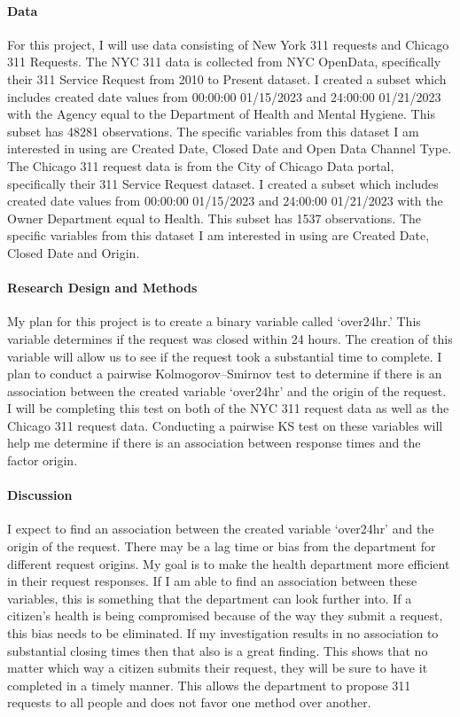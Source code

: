 \documentclass[12pt]{article}
\begin{document}
\paragraph{Data}
For this project, I will use data consisting of New York 311 requests and Chicago 311 Requests. 
The NYC 311 data is collected from NYC OpenData, specifically their 311 Service Request from 2010 to Present dataset. 
I created a subset which includes created date values from 00:00:00 01/15/2023 and 24:00:00 01/21/2023 with the Agency equal to the Department of Health and Mental Hygiene. 
This subset has 48281 observations. 
The specific variables from this dataset I am interested in using are Created Date, Closed Date and  Open Data Channel Type. 
The Chicago 311 request data is from the City of Chicago Data portal, specifically their 311 Service Request dataset. 
I created a subset which includes created date values from 00:00:00 01/15/2023 and 24:00:00 01/21/2023 with the Owner Department equal to Health. 
This subset has 1537 observations. 
The specific variables from this dataset I am interested in using are Created Date, Closed Date and Origin. 


\paragraph{Research Design and Methods}
My plan for this project is to create a binary variable called ‘over24hr.’ 
This variable determines if the request was closed within 24 hours. 
The creation of this variable will allow us to see if the request took a substantial time to complete. 
I plan to conduct a pairwise Kolmogorov–Smirnov test to determine if there is an association between the created variable ‘over24hr’ and the origin of the request. 
I will be completing this test on both of the NYC 311 request data as well as the Chicago 311 request data. 
Conducting a pairwise KS test on these variables will help me determine if there is an association between response times and the factor origin. 


\paragraph{Discussion}
I expect to find an association between the created variable ‘over24hr’ and the origin of the request. 
There may be a lag time or bias from the department for different request origins. 
My goal is to make the health department more efficient in their request responses. 
If I am able to find an association between these variables, this is something that the department can look further into. 
If a citizen's health is being compromised because of the way they submit a request, this bias needs to be eliminated. 
If my investigation results in no association to substantial closing times then that also is a great finding. 
This shows that no matter which way a citizen submits their request, they will be sure to have it completed in a timely manner. 
This allows the department to propose 311 requests to all people and does not favor one method over another. 
\end{document}
